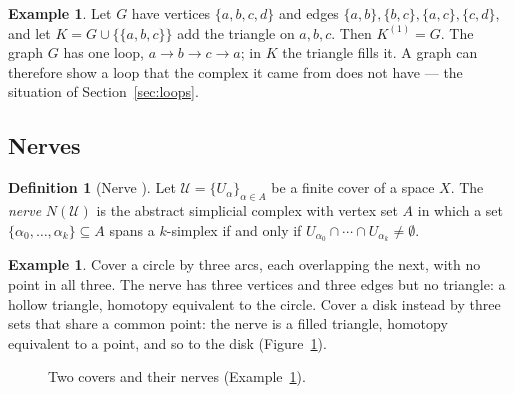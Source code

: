 \documentclass{article}
\theoremstyle{definition}
\newtheorem{definition}[theorem]{Definition}
\newtheorem{example}[theorem]{Example}
\theoremstyle{remark}
\begin{document}
\begin{example}\label{ex:graph}
Let $G$ have vertices $\{a,b,c,d\}$ and edges $\{a,b\}, \{b,c\}, \{a,c\}, \{c,d\}$, and let $K = G \cup \{\{a,b,c\}\}$ add the triangle on $a,b,c$.
Then $K^{(1)} = G$.
The graph $G$ has one loop, $a \to b \to c \to a$; in $K$ the triangle fills it.
A graph can therefore show a loop that the complex it came from does not have --- the situation of Section~\ref{sec:loops}.
\end{example}

\subsection{Nerves}
\begin{definition}[Nerve {\parencite{singh2007mapper,hatcher2001}}]
Let $\mathcal U = \{U_\alpha\}_{\alpha \in A}$ be a finite cover of a space $X$.
The \emph{nerve} $N(\mathcal U)$ is the abstract simplicial complex with vertex set $A$ in which a set $\{\alpha_0, \dots, \alpha_k\} \subseteq A$ spans a $k$-simplex if and only if $U_{\alpha_0} \cap \cdots \cap U_{\alpha_k} \neq \emptyset$.
\end{definition}

\begin{example}\label{ex:nerve}
Cover a circle by three arcs, each overlapping the next, with no point in all three.
The nerve has three vertices and three edges but no triangle: a hollow triangle, homotopy equivalent to the circle.
Cover a disk instead by three sets that share a common point: the nerve is a filled triangle, homotopy equivalent to a point, and so to the disk (Figure~\ref{fig:nerve}).
\end{example}

\begin{figure}[htbp]
\centering
{}
\caption{Two covers and their nerves (Example~\ref{ex:nerve}).}\label{fig:nerve}
\end{figure}
\end{document}
